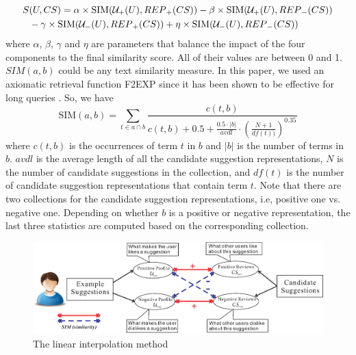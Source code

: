 \begin{equation}
\begin{split}
S&(U,CS) = \alpha \times \mathrm{SIM}({\cal U}_{+}(U),{REP}_{+}(CS)) - \beta \times \mathrm{SIM}({\cal U}_{+}(U),{REP}_{-}(CS)) \\
& - \gamma \times \mathrm{SIM}({\cal U}_{-}(U),{REP}_{+}(CS)) + \eta \times \mathrm{SIM}({\cal U}_{-}(U),{REP}_{-}(CS))
\end{split}
\label{eq:1}
\end{equation}
where $\alpha$, $\beta$, $\gamma$ and $\eta$ are parameters that balance the 
impact of the four components to the final similarity score. 
All of their values are between 0 and 1. 
$SIM(a,b)$ could be any text similarity measure. In this paper, 
we used an axiomatic retrieval function F2EXP 
\cite{Fang:2005:EAA:1076034.1076116} since it has been shown to be effective 
for long queries \cite{Fang:2005:EAA:1076034.1076116}. So, we have 
\begin{equation}
\mathrm{SIM}(a,b)=\sum_{t\in{a\cap b}}{\frac{c(t,b)}{c(t,b)+0.5+\frac{0.5\cdot |b|}{avdl}\cdot (\frac{N+1}{df(t))})^{0.35}}}
\label{eq:f2exp}
\end{equation}
where
$c(t,b)$ is the occurrences of term $t$ in $b$ and $|b|$ is the number 
of terms in $b$. $avdl$ is the average length of all the candidate 
suggestion representations, $N$ is the number of candidate suggestions 
in the collection, and $df(t)$ is the number of candidate suggestion 
representations that contain term $t$. Note that there are two collections 
for the candidate suggestion representations, 
i.e, positive one vs. negative one.  
Depending on whether $b$ is a positive or negative representation, 
the last three statistics are computed based on the corresponding collection. 

\begin{figure}[t]
    \centering
    \includegraphics[width=1.0\textwidth]{figures/algorithm.eps}
    \caption{The linear interpolation method}
    \label{fig:algorithm}
\end{figure}


